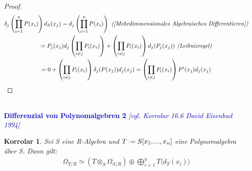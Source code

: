 \documentclass[10pt,a4paper]{report}
\newcommand{\ModulsOfDifferenzials}{David Eisenbud 1994}
\newcounter{Aussage}[chapter]
\newtheorem{korrolar}[Aussage]{Korrolar}
\newcommand{\divR}[2]{\Omega_{#1/#2}}
\newcommand{\divf}[1]{d_{#1}}
\newcommand{\Tensor}[3]{#1 \otimes_{#2} #3}
\newcommand*{\defeq}{\mathrel{\vcenter{\baselineskip0.5ex \lineskiplimit0pt
                     \hbox{\scriptsize.}\hbox{\scriptsize.}}}%
                     =}
\newcommand{\Verz}[1]{\langle #1 \rangle}
\begin{document}
\begin{proof}
\begin{gather*}
\delta_{j}\left(\prod_{i = 1}^n P(x_i)\right)\divf{S}(x_j) = \divf{j}\left(\prod_{i = 1}^n P(x_i)\right)
\textit{ (\cref{Mehrdimmensionales Algebraisches Differentieren})}\\
= P_j(x_j)\divf{j} \left( \prod_{i \neq j} P_i(x_i) \right) + \left( \prod_{i \neq j} P_i(x_i) \right) \divf{j}(P_j(x_j))
\textit{ (Leibnizregel)} \\
= 0 + \left( \prod_{i \neq j} P_i(x_i) \right) \delta_j(P(x_j))\divf{j}(x_j)
=  \left( \prod_{i \neq j} P_i(x_i) \right) P'(x_j)\divf{j}(x_j)
\end{gather*}
\end{proof}


\ \\
\textcolor{blue}{\textbf{Differenzial von Polynomalgebren 2} \textit{[vgl. Korrolar 16.6 \ModulsOfDifferenzials]}}
\begin{korrolar}\label{Differenzial von Polynomalgebren 2}
Sei S eine R-Algebra und $T \defeq S[x_1,...,x_n]$ eine Polynomalgebra über S. Dann gilt:
\begin{gather*}
\divR{T}{R} \simeq (\Tensor{T}{S}{\divR{S}{R}}) \oplus \bigoplus_{i = 1}^n T \Verz{\divf{T}(x_i)}
\end{gather*}
\end{korrolar}
\end{document}
